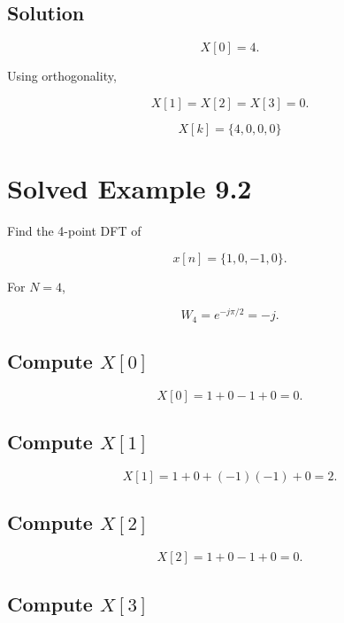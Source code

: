 
\subsection{Solution}

\[
X[0]=4.
\]

Using orthogonality,

\[
X[1]=X[2]=X[3]=0.
\]

\[
\boxed{
X[k]=\{4,0,0,0\}
}
\]


\section{Solved Example 9.2}

Find the 4-point DFT of

\[
x[n]=\{1,0,-1,0\}.
\]

For \(N=4\),

\[
W_4=e^{-j\pi/2}=-j.
\]


\subsection{Compute \(X[0]\)}

\[
X[0]=1+0-1+0=0.
\]


\subsection{Compute \(X[1]\)}

\[
X[1]=1+0+(-1)(-1)+0=2.
\]


\subsection{Compute \(X[2]\)}

\[
X[2]=1+0-1+0=0.
\]


\subsection{Compute \(X[3]\)}

